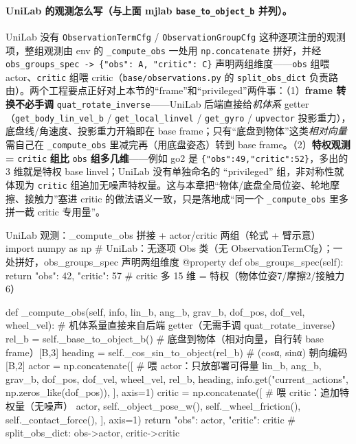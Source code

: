 \paragraph{UniLab 的观测怎么写（与上面 mjlab \texttt{base\_to\_object\_b} 并列）。}UniLab 没有 \verb|ObservationTermCfg| / \verb|ObservationGroupCfg| 这种逐项注册的观测项，整组观测由 env 的 \verb|_compute_obs| 一处用 \verb|np.concatenate| 拼好，并经 \verb|obs_groups_spec -> {"obs": A, "critic": C}| 声明两组维度——\verb|obs| 组喂 actor、\verb|critic| 组喂 critic（\verb|base/observations.py| 的 \verb|split_obs_dict| 负责路由）。两个工程要点正好对上本节的“frame”和“privileged”两件事：（1）\textbf{frame 转换不必手调} \verb|quat_rotate_inverse|——UniLab 后端直接给\emph{机体系} getter（\verb|get_body_lin_vel_b| / \verb|get_local_linvel| / \verb|get_gyro| / \verb|upvector| 投影重力），底盘线/角速度、投影重力开箱即在 base frame；只有“底盘到物体”这类\emph{相对向量}需自己在 \verb|_compute_obs| 里减完再（用底盘姿态）转到 base frame。（2）\textbf{特权观测 =} \verb|critic| \textbf{组比} \verb|obs| \textbf{组多几维}——例如 go2 是 \verb|{"obs":49,"critic":52}|，多出的 3 维就是特权 base linvel；UniLab 没有单独命名的 “privileged” 组，非对称性就体现为 \verb|critic| 组追加无噪声特权量。这与本章把“物体/底盘全局位姿、轮地摩擦、接触力”塞进 critic 的做法语义一致，只是落地成“同一个 \verb|_compute_obs| 里多拼一截 critic 专用量”。

\begin{codebox}[Python]{UniLab 观测：\_compute\_obs 拼接 + actor/critic 两组（轮式 + 臂示意）}
import numpy as np
# UniLab：无逐项 Obs 类（无 ObservationTermCfg）；一处拼好，obs_groups_spec 声明两组维度
@property
def obs_groups_spec(self):
    return {"obs": 42, "critic": 57}               # critic 多 15 维 = 特权（物体位姿7/摩擦2/接触力6）

def _compute_obs(self, info, lin_b, ang_b, grav_b, dof_pos, dof_vel, wheel_vel):
    # 机体系量直接来自后端 getter（无需手调 quat_rotate_inverse）
    rel_b = self._base_to_object_b()               # 底盘到物体（相对向量，自行转 base frame）[B,3]
    heading = self._cos_sin_to_object(rel_b)       # (cosα, sinα) 朝向编码 [B,2]
    actor = np.concatenate([                       # 喂 actor：只放部署可得量
        lin_b, ang_b, grav_b, dof_pos, dof_vel, wheel_vel, rel_b, heading,
        info.get("current_actions", np.zeros_like(dof_pos)),
    ], axis=1)
    critic = np.concatenate([                      # 喂 critic：追加特权量（无噪声）
        actor, self._object_pose_w(), self._wheel_friction(), self._contact_force(),
    ], axis=1)
    return {"obs": actor, "critic": critic}        # split_obs_dict: obs->actor, critic->critic
\end{codebox}

